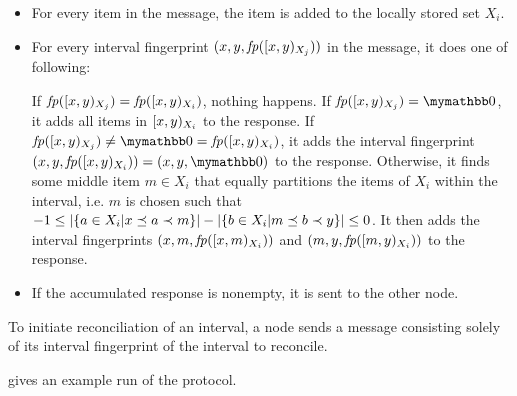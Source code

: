 \begin{itemize}
  \item For every item in the message, the item is added to the locally stored set $X_i$.
  \item For every interval fingerprint $({x}, {y}, {\mathit{fp}([{x},{y})_{X_j})})$ in the message, it does one of following:
    \begin{caselist}
       \label{def-fingerprint-eq}  If $\mathit{fp}([{x},{y})_{X_j}) = \mathit{fp}([{x},{y})_{X_i})$, nothing happens.
       If $\fp{\interval{x}{y}{X_j}} = \neutraladd$, it adds all items in $[{x},{y})_{X_i}$ to the response.
       \label{def-x1-empty} If $\fp{\interval{x}{y}{X_j}} \neq \neutraladd = \fp{\interval{x}{y}{X_i}}$, it adds the interval fingerprint $\ifp{x}{y}{X_i} = \ifpmanual{x}{y}{\neutraladd}$ to the response.
      \case[Recursive] \label{def-recursive} Otherwise, it finds some middle item $m \in X_i$ that equally partitions the items of $X_i$ within the interval, i.e. $m$ is chosen such that $-1 \leq |{\{a \in X_i | x \preceq a \prec m\}}| - |{\{b \in X_i | m \preceq b \prec y\}}| \leq 0$. It then adds the interval fingerprints $({x}, {m}, {\mathit{fp}([{x},{m})_{X_i})})$ and $({m}, {y}, {\mathit{fp}([{m},{y})_{X_i})})$ to the response.
    \end{caselist}
  \item If the accumulated response is nonempty, it is sent to the other node.
\end{itemize}

To initiate reconciliation of an interval, a node sends a message consisting solely of its interval fingerprint of the interval to reconcile.

 gives an example run of the protocol.

